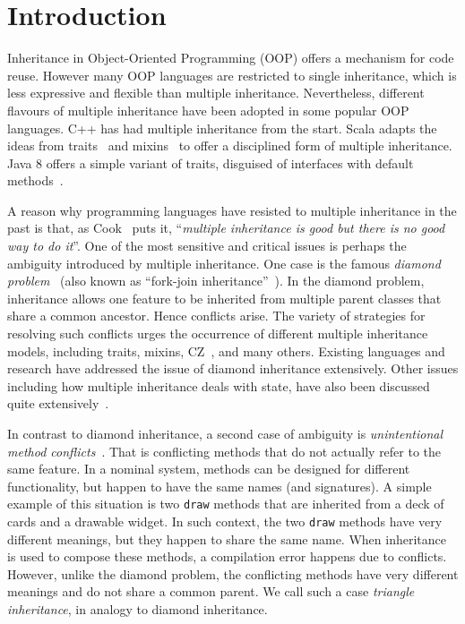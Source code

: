 \section{Introduction}
Inheritance in Object-Oriented Programming (OOP) offers a mechanism
for code reuse. However many OOP languages are restricted to single
inheritance, which is less expressive and flexible than multiple
inheritance. Nevertheless, different flavours of multiple inheritance
have been adopted in some popular OOP languages. C++ has had 
multiple inheritance from the start. Scala adapts the ideas from traits~\cite{scharli03traits,Ducasse:2006:TMF:1119479.1119483,Liquori08ftj}
and mixins~\cite{bracha90mixin,Flatt1998,van1996encapsulation,Ancona2003,Hendler86} to offer a disciplined form of multiple inheritance. Java 8 
offers a simple variant of traits, disguised of interfaces with default methods~\cite{goetz12fdefenders}.

A reason why programming languages have resisted to multiple
inheritance in the past is that, as Cook~\cite{Cook1987} puts it, 
``\emph{multiple inheritance is good but there is no good way to do it}''.
One of the most sensitive and critical issues is perhaps the ambiguity
introduced by multiple inheritance. One case is the famous
\textit{diamond problem}~\cite{Sak89dis,Singh1995} (also known as ``fork-join inheritance''~\cite{Sak89dis}). 
In the diamond problem, inheritance allows
one feature to be inherited from multiple parent classes that share a
common ancestor. Hence
conflicts arise. The variety of strategies for resolving such conflicts
urges the occurrence of different multiple inheritance models,
including traits, mixins, CZ~\cite{malayeri2009cz}, and many others. Existing
languages and research have addressed the issue of diamond inheritance extensively. Other issues
including how multiple inheritance deals with state, 
have also been discussed quite extensively~\cite{classless,malayeri2009cz,stroustrup1995}.

In contrast to diamond inheritance, a second case of ambiguity
is \textit{unintentional method conflicts}~\cite{scharli03traits}. That is conflicting 
methods that do not actually refer to the same feature. 
In a nominal system, methods can be designed for different
functionality, but happen to have the same names (and signatures).
A simple example of this situation is two \lstinline{draw} methods that
are inherited from a deck of cards and a drawable widget. 
In such context, the two \lstinline{draw} methods have very different meanings, 
but they happen to share the same name.
When inheritance is used to compose these methods, a compilation 
error happens due to conflicts. However, unlike the diamond problem,
the conflicting methods have very different meanings and do not share a
common parent. We call such a case \textit{triangle inheritance}, in
analogy to diamond inheritance.

